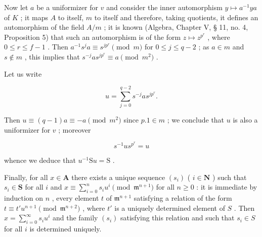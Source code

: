 Now let \(a\) be a uniformizer for \(v\) and consider the inner automorphism \(y \mapsto a^{-1}ya\) of \(K\) ; it maps \(A\) to itself, \(m\) to itself and therefore, taking quotients, it defines an automorphism of the field \(A/m\) ; it is known (Algebra, Chapter V, § 11, no. 4, Proposition 5) that such an automorphism is of the form \(z \mapsto z^{p^r}\) , where \(0 \leqslant r \leqslant f - 1\) . Then \(a^{-1}s^j a \equiv s^{jp^r} \pmod{m}\) for \(0 \leqslant j \leqslant q - 2\) ; as \(a \in m\) and \(s \notin m\) , this implies that \(s^{-j}as^{jp^r} \equiv a \pmod{m^2}\) .

Let us write

\[
u = \sum_ {j = 0} ^ {q - 2} s ^ {- j} a s ^ {j p ^ {r}}.
\]

Then \(u \equiv (q - 1)a \equiv -a \pmod{m^2}\) since \(p.1 \in m\) ; we conclude that \(u\) is also a uniformizer for \(v\) ; moreover

\[
s ^ {- 1} u s ^ {p ^ {r}} = u\tag{3}
\]

whence we deduce that \(u^{-1} \mathrm{S}u = \mathrm{S}\) .

Finally, for all \(x \in \mathbf{A}\) there exists a unique sequence \((s_i)\) ( \(i \in \mathbf{N}\) ) such that \(s_i \in \mathbf{S}\) for all \(i\) and \(x \equiv \sum_{i=0}^{n} s_i u^i \pmod{\mathfrak{m}^{n+1}}\) for all \(n \geqslant 0\) : it is immediate by induction on \(n\) , every element \(t\) of \(\mathfrak{m}^{n+1}\) satisfying a relation of the form \(t \equiv t'u^{n+1} \pmod{\mathfrak{m}^{n+2}}\) , where \(t'\) is a uniquely determined element of \(S\) . Then \(x = \sum_{i=0}^{\infty} s_i u^i\) and the family \((s_i)\) satisfying this relation and such that \(s_i \in S\) for all \(i\) is determined uniquely.

